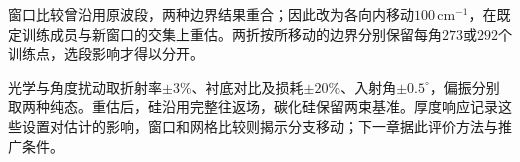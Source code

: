 窗口比较曾沿用原波段，两种边界结果重合；因此改为各向内移动$100\,\mathrm{cm}^{-1}$，在既定训练成员与新窗口的交集上重估。两折按所移动的边界分别保留每角$273$或$292$个训练点，选段影响才得以分开。

光学与角度扰动取折射率$\pm3\%$、衬底对比及损耗$\pm20\%$、入射角$\pm0.5^\circ$，偏振分别取两种纯态。重估后，硅沿用完整往返场，碳化硅保留两束基准。厚度响应记录这些设置对估计的影响，窗口和网格比较则揭示分支移动；下一章据此评价方法与推广条件。
